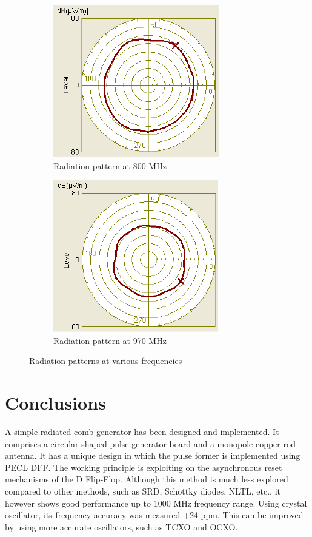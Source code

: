 \documentclass{pj}
\begin{document}
\begin{figure}[ht]
\begin{subfigure}[b]{0.5\linewidth}
		\includegraphics[width=0.75\linewidth]{pattern_800_MHz.pdf} 
		\caption{Radiation pattern at 800 MHz} 
		\label{fig:rad_patt_800} 
	\end{subfigure}%
	\begin{subfigure}[b]{0.5\linewidth}
		\centering
		\includegraphics[width=0.75\linewidth]{pattern_970_MHz.pdf} 
		\caption{Radiation pattern at 970 MHz} 
		\label{fig:rad_patt_970} 
	\end{subfigure} 
	\caption{Radiation patterns at various frequencies}
	\label{fig:rad_patt_all} 
\end{figure}

\section{Conclusions}

A simple radiated comb generator has been designed and implemented. It comprises a circular-shaped pulse generator board and a monopole copper rod antenna. It has a unique design in which the pulse former is implemented using PECL DFF. The working principle is exploiting on the asynchronous reset mechanisms of the D Flip-Flop. Although this method is much less explored compared to other methods, such as SRD, Schottky diodes, NLTL, etc., it however shows good performance up to 1000 MHz frequency range. Using crystal oscillator, its frequency accuracy was measured +24 ppm. This can be improved by using more accurate oscillators, such as TCXO and OCXO.  
\end{document}
